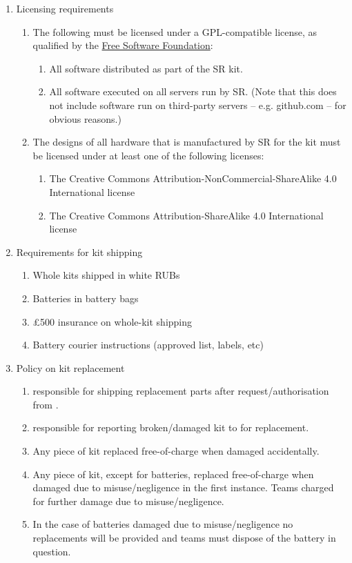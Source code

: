 \begin{enumerate}
\item Licensing requirements
  \begin{enumerate}

  \item The following must be licensed under a GPL-compatible license, as qualified by the \href{http://www.gnu.org/licenses/license-list.en.html#GPLCompatibleLicenses}{Free Software Foundation}:
    \begin{enumerate}
    \item All software distributed as part of the SR kit.
    \item All software executed on all servers run by SR. (Note that this does not include software run on third-party servers -- e.g. github.com -- for obvious reasons.)
    \end{enumerate}

  \item The designs of all hardware that is manufactured by SR for the kit must be licensed under at least one of the following licenses:
    \begin{enumerate}
    \item The Creative Commons Attribution-NonCommercial-ShareAlike 4.0 International license
    \item The Creative Commons Attribution-ShareAlike 4.0 International license
    \end{enumerate}
  \end{enumerate}


\item Requirements for kit shipping
  \begin{enumerate}
    \item{Whole kits shipped in white RUBs}
    \item{Batteries in battery bags}
    \item{\pounds500 insurance on whole-kit shipping}
    \item{Battery courier instructions (approved list, labels, etc)}
  \end{enumerate}
\item Policy on kit replacement
  \begin{enumerate}
    \item{ responsible for shipping replacement parts after request/authorisation from .}
    \item{ responsible for reporting broken/damaged kit to  for replacement.}
    \item{Any piece of kit replaced free-of-charge when damaged accidentally.}
    \item{Any piece of kit, except for batteries, replaced free-of-charge when damaged due to misuse/negligence in the first instance. Teams charged for further damage due to misuse/negligence.}
    \item{In the case of batteries damaged due to misuse/negligence no replacements will be provided and teams must dispose of the battery in question.}
  \end{enumerate}

\end{enumerate}
